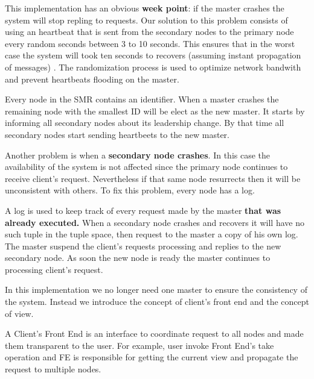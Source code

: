 \documentclass[times, 10pt,twocolumn]{article}
\begin{document}
This implementation has an obvious \textbf{week point}: if the master crashes 
the system will stop repling to requests.
Our solution to this problem consists of using an heartbeat that is sent from the
secondary nodes to the primary node every random seconds between 3 to 10 seconds.
This ensures that in the worst case the system will took ten seconds to
recovers (assuming instant propagation of messages) . 
The randomization process is used to optimize network bandwith and
prevent heartbeats flooding on the master.

Every node in the SMR contains an identifier. When a master crashes the remaining
node with the smallest ID will be elect as the new master. It starts by informing
all secondary nodes about its leadership change. By that time all secondary nodes
start sending heartbeets to the new master.

Another problem is when a \textbf{secondary node crashes}. In this case the
availability of the system is not affected since the primary node continues 
to receive client's request. Nevertheless if that same node resurrects then it
will be unconsistent with others. To fix this problem, every node has a log.

A log is used to keep track of every request made by the master 
\textbf{that was already executed.} When a secondary node crashes and recovers
it will have no such tuple in the tuple space, then request to the master
a copy of his own log. The master suspend the client's requests processing and
replies to the new secondary node. As soon the new node is ready the master
continues to processing client's request.




In this implementation we no longer need one master to ensure the consistency of the system. Instead we introduce the concept of client's front end and the concept of view.

A Client's Front End is an interface to coordinate request to all nodes and made
them transparent to the user. For example, user invoke Front End's take operation
and FE is responsible for getting the current view and propagate the request
to multiple nodes.
\end{document}
